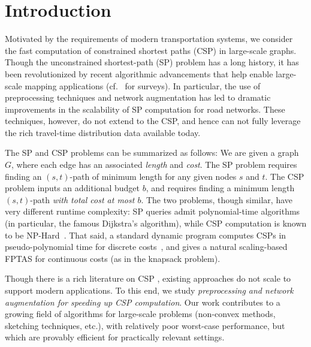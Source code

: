 \documentclass[opre,nonblindrev]{informs3} %
\begin{document}


\maketitle

\section{Introduction}
Motivated by the requirements of modern transportation systems, we consider the fast computation of constrained shortest paths (CSP) in large-scale graphs. 
Though the unconstrained shortest-path (SP) problem has a long history, it has been revolutionized by recent algorithmic advancements that help enable large-scale mapping applications (cf.~\citep{goldberg_survey,dimacs09} for surveys).
In particular, the use of preprocessing techniques and network augmentation has led to dramatic improvements in the scalability of SP computation for road networks.
These techniques, however, do not extend to the CSP, and hence can not fully leverage the rich travel-time distribution data available today.

The SP and CSP problems can be summarized as follows: 
We are given a graph $G$, where each edge has an associated \emph{length} and \emph{cost}. 
The SP problem requires finding an $(s,t)$-path of minimum length for any given nodes $s$ and $t$. 
The CSP problem inputs an additional budget $b$, and requires finding a minimum length $(s,t)$-path \emph{with total cost at most $b$}.
The two problems, though similar, have very different runtime complexity: SP queries admit polynomial-time algorithms (in particular, the famous Dijkstra's algorithm), while CSP computation is known to be NP-Hard~\citep{csp_survey}.
That said, a standard dynamic program computes CSPs in pseudo-polynomial time for discrete costs~\citep{alex_bicriteria}, and gives a natural scaling-based FPTAS for continuous costs (as in the knapsack problem).

Though there is a rich literature on CSP \citep{csp_survey}, existing approaches do not scale to support modern applications. 
To this end, we study \emph{preprocessing and network augmentation for speeding up CSP computation}.
Our work contributes to a growing field of algorithms for large-scale problems (non-convex methods, sketching techniques, etc.), with relatively poor worst-case performance, but which are provably efficient for practically relevant settings.
\end{document}
